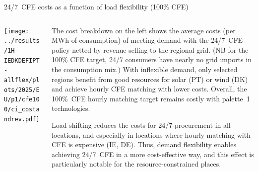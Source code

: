 \begin{frame}{24/7~CFE costs as a function of load flexibility (100\% CFE)}

  {\footnotesize
  \vspace{0.2cm}
  
  \begin{columns}[T]
  \begin{column}{9cm}
  \centering
  \texttt{[image: ../results/1H-IEDKDEFIPT-allflex/plots/2025/EU/p1/cfe100/ci\_costandrev.pdf]}
  \end{column}

  \begin{column}{6cm}
  The \alert{cost breakdown} on the left shows the average costs (per MWh of consumption) of meeting demand with the 24/7~CFE policy netted by revenue selling to the regional grid. (NB for the 100\% CFE target, 24/7 consumers have nearly no grid imports in the consumption mix.) With inflexible demand, only selected regions benefit from good resources for solar (PT) or wind (DK) and achieve hourly CFE matching with lower costs. Overall, the 100\%~CFE hourly matching target remains costly with palette~1 technologies.

  \vspace{0.1cm}
  \alert{Load shifting reduces the costs for 24/7 procurement in all locations}, and especially in locations where hourly matching with CFE is expensive (IE, DE). Thus, demand flexibility enables achieving 24/7~CFE in a more cost-effective way, and this effect is particularly notable for \alert{the resource-constrained places}.

  \end{column}
  \end{columns}
  }
\end{frame}
  


